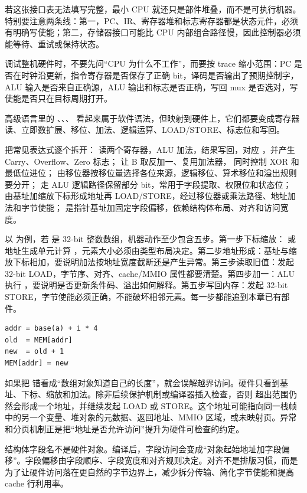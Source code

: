 若这张接口表无法填写完整，最小 CPU 就还只是部件堆叠，而不是可执行机器。特别要注意两条线：第一，PC、IR、寄存器堆和标志寄存器都是状态元件，必须有明确写使能；第二，存储器接口可能比 CPU 内部组合路径慢，因此控制器必须能等待、重试或保持状态。

调试整机硬件时，不要先问“CPU 为什么不工作”，而要按 trace 缩小范围：PC 是否在时钟沿更新，指令寄存器是否保存了正确 bit，译码是否输出了预期控制字，ALU 输入是否来自正确源，ALU 输出和标志是否正确，写回 mux 是否选对，写使能是否只在目标周期打开。

高级语言里的 、、、 看起来属于软件语法，但映射到硬件上，它们都要变成寄存器读、立即数扩展、移位、加法、逻辑运算、LOAD/STORE、标志位和写回。

把常见表达式逐个拆开： 读两个寄存器，ALU 加法，结果写回，对应 ，并产生 Carry、Overflow、Zero 标志； 让 B 取反加一、复用加法器， 同时控制 XOR 和最低位进位； 由移位器按移位量选择各位来源，逻辑移位、算术移位和溢出规则要分开； 走 ALU 逻辑路径保留部分 bit，常用于字段提取、权限位和状态位； 由基址加缩放下标形成地址再 LOAD/STORE，经过移位器或乘法路径、地址加法和字节使能； 是指针基址加固定字段偏移，依赖结构体布局、对齐和访问宽度。

以  为例，若  是 32-bit 整数数组，机器动作至少包含五步。第一步下标缩放： 或地址生成单元计算 ，元素大小必须由类型布局决定。第二步地址形成：基址与缩放下标相加，要说明加法按地址宽度截断还是产生异常。第三步读取旧值：发起 32-bit LOAD，字节序、对齐、cache/MMIO 属性都要清楚。第四步加一：ALU 执行 ，要说明是否更新条件码、溢出如何解释。第五步写回内存：发起 32-bit STORE，字节使能必须正确，不能破坏相邻元素。每一步都能追到本章已有部件。

\begin{lstlisting}
addr = base(a) + i * 4
old  = MEM[addr]
new  = old + 1
MEM[addr] = new
\end{lstlisting}

如果把  错看成“数组对象知道自己的长度”，就会误解越界访问。硬件只看到基址、下标、缩放和加法。除非后续保护机制或编译器插入检查，否则  超出范围仍然会形成一个地址，并继续发起 LOAD 或 STORE。这个地址可能指向同一栈帧中的另一个变量、堆对象的元数据、返回地址、MMIO 区域，或未映射页。异常和分页机制正是把“地址是否允许访问”提升为硬件可检查的约定。

结构体字段名不是硬件对象。编译后，字段访问会变成“对象起始地址加字段偏移”。字段偏移由字段顺序、字段宽度和对齐规则决定。对齐不是排版习惯，而是为了让硬件访问落在更自然的字节边界上，减少拆分传输、简化字节使能和提高 cache 行利用率。

